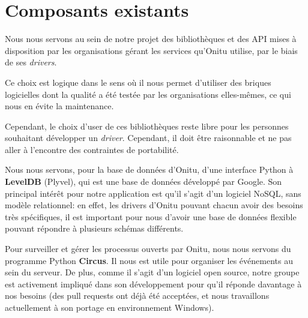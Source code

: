 \section{Composants existants}
\thispagestyle{EIP} %
Nous nous servons au sein de notre projet des bibliothèques et des API mises à disposition par les organisations gérant les services qu'Onitu utilise, par le biais de ses \textit{drivers}.

Ce choix est logique dans le sens où il nous permet d'utiliser des briques logicielles dont la qualité a été testée par les organisations elles-mêmes, ce qui nous en évite la maintenance.

Cependant, le choix d'user de ces bibliothèques reste libre pour les personnes souhaitant développer un \textit{driver}. Cependant, il doit être raisonnable et ne pas aller à l'encontre des contraintes de portabilité.

Nous nous servons, pour la base de données d'Onitu, d'une interface Python à \textbf{LevelDB} (Plyvel), qui est une base de données développé par Google. Son principal intérêt pour notre application est qu'il s'agit d'un logiciel NoSQL, sans modèle relationnel: en effet, les drivers d'Onitu pouvant chacun avoir des besoins très spécifiques, il est important pour nous d'avoir une base de données flexible pouvant répondre à plusieurs schémas différents.

Pour surveiller et gérer les processus ouverts par Onitu, nous nous servons du programme Python \textbf{Circus}. Il nous est utile pour organiser les événements au sein du serveur. De plus, comme il s'agit d'un logiciel open source, notre groupe est activement impliqué dans son développement pour qu'il réponde davantage à nos besoins (des pull requests ont déjà été acceptées, et nous travaillons actuellement à son portage en environnement Windows).